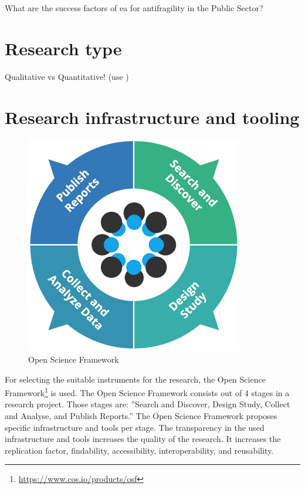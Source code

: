 What are the success factors of \acrlong{ea} for \gls{antifragility} in the Public Sector?

\section{Research type}

\begin{remark}
	Qualitative vs Quantitative! (use \parencite{Recker2013})
\end{remark}


\section{Research infrastructure and tooling}
\label{sec:researchinfraandtooling}
\begin{figure}
	\begin{center}
		\includegraphics[width=0.5\linewidth]{images/osfframework}
		\caption[Open Science Framework]{Open Science Framework}
		\label{fig:osfframework}
	\end{center}
\end{figure}
For selecting the suitable instruments for the research, the Open Science Framework\footnote{\url{https://www.cos.io/products/osf}} is used. The Open Science Framework consists out of 4 stages in a research project. Those stages are: ''Search and Discover, Design Study, Collect and Analyse, and Publish Reports.'' The Open Science Framework proposes specific infrastructure and tools per stage. The transparency in the used infrastructure and tools increases the quality of the research. It increases the replication factor, findability, accessibility, interoperability, and reusability.
